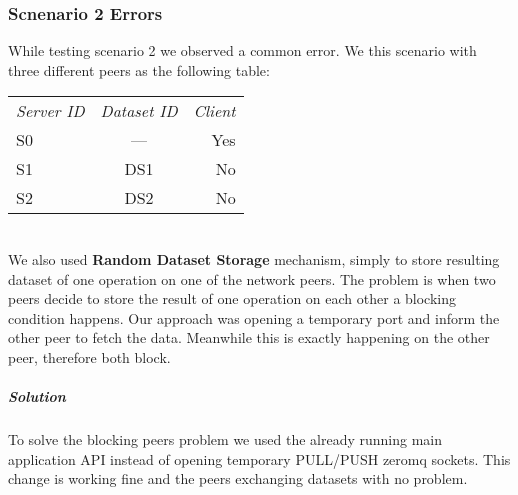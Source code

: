 \subsubsection{Scnenario 2 Errors}
While testing scenario 2 we observed a common error. We this scenario with three different peers as the following table:

\begin{tabular}{ l c r }
\em{Server ID} & \em{ Dataset ID} & \em{ Client} \\
S0 & --- & Yes \\
S1 & DS1 & No \\
S2 & DS2 & No \\
\end{tabular}\\

We also used \textbf{Random Dataset Storage} mechanism, simply to store resulting dataset of one operation on one of the network
peers. The problem is when two peers decide to store the result of one operation on each other a blocking condition happens. Our
approach was opening a temporary port and inform the other peer to fetch the data. Meanwhile this is exactly happening on the other
peer, therefore both block.

\subparagraph{Solution}
To solve the blocking peers problem we used the already running main application API instead of opening temporary PULL/PUSH zeromq 
sockets. This change is working fine and the peers exchanging datasets with no problem.
